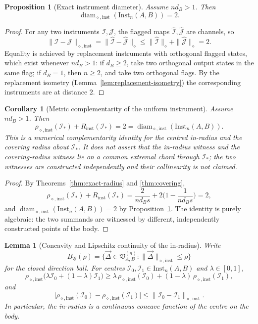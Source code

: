 \documentclass[11pt,a4paper]{article}
\newtheorem{lemma}[theorem]{Lemma}
\newtheorem{proposition}[theorem]{Proposition}
\newtheorem{corollary}[theorem]{Corollary}
\newcommand{\Inst}{\mathrm{Inst}}
\newcommand{\diam}{\operatorname{diam}}
\newcommand{\vD}{\vec{\Delta}}
\begin{document}
\begin{proposition}[Exact instrument diameter]
\label{prop:diameter}
Assume $nd_B>1$. Then
\[
\diam_{\diamond,\mathrm{inst}}(\Inst_n(A,B))=2.
\]
\end{proposition}

\begin{proof}
For any two instruments $\mathcal I,\mathcal J$, the flagged maps $\widehat{\mathcal I},\widehat{\mathcal J}$ are channels, so
\[
\|\mathcal I-\mathcal J\|_{\diamond,\mathrm{inst}}
=\|\widehat{\mathcal I}-\widehat{\mathcal J}\|_\diamond
\le\|\widehat{\mathcal I}\|_\diamond+\|\widehat{\mathcal J}\|_\diamond=2.
\]
Equality is achieved by replacement instruments with orthogonal flagged states, which exist whenever $nd_B>1$: if $d_B\ge2$, take two orthogonal output states in the same flag; if $d_B=1$, then $n\ge2$, and take two orthogonal flags. By the replacement isometry (Lemma~\ref{lem:replacement-isometry}) the corresponding instruments are at distance $2$.
\end{proof}

\begin{corollary}[Metric complementarity of the uniform instrument]
\label{cor:complementarity}
Assume $nd_B>1$. Then
\[
\rho_{\diamond,\mathrm{inst}}(\mathcal I_*)+R_{\mathrm{inst}}(\mathcal I_*)
=2=\diam_{\diamond,\mathrm{inst}}(\Inst_n(A,B)).
\]
This is a numerical complementarity identity for the centred in-radius and the covering radius about $\mathcal I_*$. It does \emph{not} assert that the in-radius witness and the covering-radius witness lie on a common extremal chord through $\mathcal I_*$; the two witnesses are constructed independently and their collinearity is not claimed.
\end{corollary}

\begin{proof}
By Theorems~\ref{thm:exact-radius} and \ref{thm:covering},
\[
\rho_{\diamond,\mathrm{inst}}(\mathcal I_*)+R_{\mathrm{inst}}(\mathcal I_*)
=\frac{2}{nd_Bs}+2\Big(1-\frac1{nd_Bs}\Big)=2,
\]
and $\diam_{\diamond,\mathrm{inst}}(\Inst_n(A,B))=2$ by Proposition~\ref{prop:diameter}. The identity is purely algebraic: the two summands are witnessed by different, independently constructed points of the body.
\end{proof}

\begin{lemma}[Concavity and Lipschitz continuity of the in-radius]
\label{lem:inradius-concave}
Write
\[
B_{\mathfrak V}(\rho)=\{\vD\in\mathfrak V_{A,B}^{(n)}:\|\vD\|_{\diamond,\mathrm{inst}}\le\rho\}
\]
for the closed direction ball. For centres $\mathcal I_0,\mathcal I_1\in\Inst_n(A,B)$ and $\lambda\in[0,1]$,
\[
\rho_{\diamond,\mathrm{inst}}\big(\lambda\mathcal I_0+(1-\lambda)\mathcal I_1\big)
\ge\lambda\,\rho_{\diamond,\mathrm{inst}}(\mathcal I_0)+(1-\lambda)\,\rho_{\diamond,\mathrm{inst}}(\mathcal I_1),
\]
and
\[
\big|\rho_{\diamond,\mathrm{inst}}(\mathcal I_0)-\rho_{\diamond,\mathrm{inst}}(\mathcal I_1)\big|
\le\|\mathcal I_0-\mathcal I_1\|_{\diamond,\mathrm{inst}}.
\]
In particular, the in-radius is a continuous concave function of the centre on the body.
\end{lemma}
\end{document}
